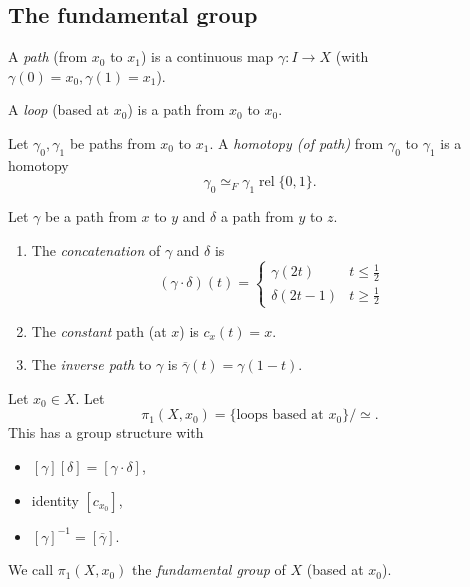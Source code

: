 \documentclass[a4paper]{article}
\DeclareMathOperator{\rel}{rel}
\begin{document}
\subsection{The fundamental group}

\begin{definition}
  A \emph{path} (from \(x_0\) to \(x_1\)) is a continuous map \(\gamma: I \to X\) (with \(\gamma(0) = x_0, \gamma(1) = x_1\)).

  A \emph{loop} (based at \(x_0\)) is a path from \(x_0\) to \(x_0\).
\end{definition}

\begin{definition}
  Let \(\gamma_0, \gamma_1\) be paths from \(x_0\) to \(x_1\). A \emph{homotopy (of path)} from \(\gamma_0\) to \(\gamma_1\) is a homotopy
  \[
    \gamma_0 \simeq_F \gamma_1 \rel \{0, 1\}.
  \]
\end{definition}

\begin{definition}
  Let \(\gamma\) be a path from \(x\) to \(y\) and \(\delta\) a path from \(y\) to \(z\).
  \begin{enumerate}
  \item The \emph{concatenation} of \(\gamma\) and \(\delta\) is
    \[
      (\gamma \cdot \delta) (t) =
      \begin{cases}
        \gamma(2t) & t \leq \frac{1}{2} \\
        \delta(2t - 1) & t \geq \frac{1}{2}
      \end{cases}
    \]
  \item The \emph{constant} path (at \(x\)) is \(c_x(t) = x\).
  \item The \emph{inverse path} to \(\gamma\) is \(\overline \gamma(t) = \gamma(1 - t)\).
  \end{enumerate}
\end{definition}

\begin{theorem}
  Let \(x_0 \in X\). Let
  \[
    \pi_1(X, x_0) = \{\text{loops based at } x_0\} / \simeq.
  \]
  This has a group structure with
  \begin{itemize}
  \item \([\gamma][\delta] = [\gamma \cdot \delta]\),
  \item identity \([c_{x_0}]\),
  \item \([\gamma]^{-1} = [\overline \gamma]\).
  \end{itemize}

  We call \(\pi_1(X, x_0)\) the \emph{fundamental group} of \(X\) (based at \(x_0\)).
\end{theorem}
\end{document}
